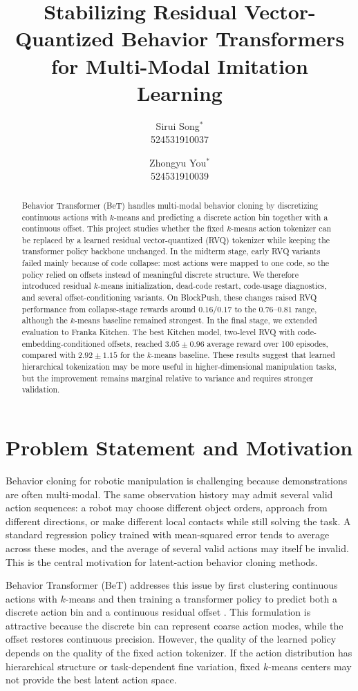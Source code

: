 \documentclass[conference]{IEEEtran}
\title{Stabilizing Residual Vector-Quantized Behavior Transformers for Multi-Modal Imitation Learning}
\author{
    Sirui Song$^*$ \\
    524531910037
    \and
    Zhongyu You$^*$ \\
    524531910039
    \\[2ex]
}
\begin{document}
\maketitle

\begin{abstract}
Behavior Transformer (BeT) handles multi-modal behavior cloning by discretizing continuous actions with $k$-means and predicting a discrete action bin together with a continuous offset. This project studies whether the fixed $k$-means action tokenizer can be replaced by a learned residual vector-quantized (RVQ) tokenizer while keeping the transformer policy backbone unchanged. In the midterm stage, early RVQ variants failed mainly because of code collapse: most actions were mapped to one code, so the policy relied on offsets instead of meaningful discrete structure. We therefore introduced residual $k$-means initialization, dead-code restart, code-usage diagnostics, and several offset-conditioning variants. On BlockPush, these changes raised RVQ performance from collapse-stage rewards around $0.16/0.17$ to the $0.76$--$0.81$ range, although the $k$-means baseline remained strongest. In the final stage, we extended evaluation to Franka Kitchen. The best Kitchen model, two-level RVQ with code-embedding-conditioned offsets, reached $3.05 \pm 0.96$ average reward over 100 episodes, compared with $2.92 \pm 1.15$ for the $k$-means baseline. These results suggest that learned hierarchical tokenization may be more useful in higher-dimensional manipulation tasks, but the improvement remains marginal relative to variance and requires stronger validation.
\end{abstract}

\section{Problem Statement and Motivation}

Behavior cloning for robotic manipulation is challenging because demonstrations are often multi-modal. The same observation history may admit several valid action sequences: a robot may choose different object orders, approach from different directions, or make different local contacts while still solving the task. A standard regression policy trained with mean-squared error tends to average across these modes, and the average of several valid actions may itself be invalid. This is the central motivation for latent-action behavior cloning methods.

Behavior Transformer (BeT) addresses this issue by first clustering continuous actions with $k$-means and then training a transformer policy to predict both a discrete action bin and a continuous residual offset \cite{shafiullah2022bet}. This formulation is attractive because the discrete bin can represent coarse action modes, while the offset restores continuous precision. However, the quality of the learned policy depends on the quality of the fixed action tokenizer. If the action distribution has hierarchical structure or task-dependent fine variation, fixed $k$-means centers may not provide the best latent action space.
\end{document}
